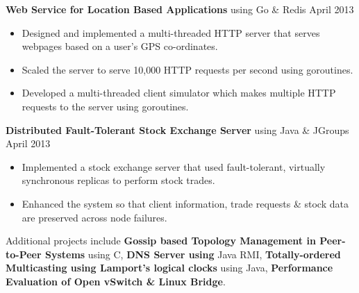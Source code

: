 \documentclass[10pt, letterpaper]{article}
\begin{document}

\textbf{Web Service for Location Based Applications} using Go \& Redis \hfill April 2013
\begin{itemize}
    \item Designed and implemented a multi-threaded HTTP server that serves webpages
based on a user's GPS co-ordinates.
    \item Scaled the server to serve 10,000 HTTP requests per second using goroutines.
    \item Developed a multi-threaded client simulator which makes multiple HTTP requests
to the server using goroutines.
\end{itemize}

\textbf{Distributed Fault-Tolerant Stock Exchange Server} using Java \& JGroups \hfill April 2013
\begin{itemize}
    \item Implemented a stock exchange server that used fault-tolerant, virtually synchronous replicas to perform stock trades.
    \item Enhanced the system so that client information, trade requests \& stock data are preserved across node failures. %
\end{itemize}

Additional projects include 
\textbf{Gossip based Topology Management in Peer-to-Peer Systems} using C,  
\textbf{DNS Server using} Java RMI, 
\textbf{Totally-ordered Multicasting using Lamport's logical clocks} using Java, 
\textbf{Performance Evaluation of Open vSwitch \& Linux Bridge}.
\end{document}

